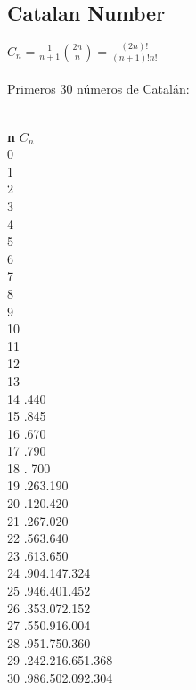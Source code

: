 \documentclass[11pt,letterpaper,twocolumn,twosided]{article}
\begin{document}
\subsection{Catalan Number}

{\LARGE $C_{n} = \frac{1}{n+1}\binom{2n}{n} = \frac{(2n)!}{(n+1)!n!}$}\\ \\
Primeros 30 n\'umeros de Catal\'an:
\\ \\
\begin{tabbing}
\textbf{n}\hspace{3cm} \=  \textbf{$C_{n}$}\hspace{4cm}  \\ 
0  \\ 
1  \\ 
2  \\ 
3  \\ 
4  \\ 
5  \\ 
6  \\ 
7  \\ 
8 \\ 
9 \\ 
10 \\ 
11 \\
12 \\
13 \\ 
14 .440\\ 
15 .845\\ 
16 .670\\
17 .790\\
18 . 700\\
19 .263.190\\
20 .120.420\\ 
21 .267.020\\
22 .563.640\\ 
23 .613.650\\ 
24 .904.147.324\\
25 .946.401.452\\ 
26 .353.072.152\\ 
27 .550.916.004\\ 
28 .951.750.360\\ 
29 .242.216.651.368\\
30 .986.502.092.304\\ 
\end{tabbing}
\end{document}
